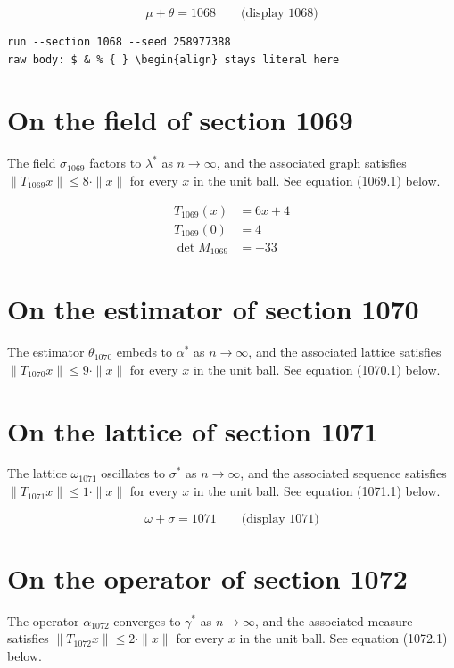 \documentclass{article}
\begin{document}
$$
\mu + \theta = 1068 \qquad \text{(display 1068)}
$$

\begin{verbatim}
run --section 1068 --seed 258977388
raw body: $ & % { } \begin{align} stays literal here
\end{verbatim}

\section{On the field of section 1069}
The field $\sigma_{1069}$ factors to $\lambda^{*}$ as $n \to \infty$,
and the associated graph satisfies $\|T_{1069} x\| \leq 8 \cdot \|x\|$
for every $x$ in the unit ball. See equation (1069.1) below.

\begin{align}
T_{1069}(x) &= 6 x + 4 \\
T_{1069}(0) &= 4 \\
\det M_{1069} &= -33
\end{align}

\section{On the estimator of section 1070}
The estimator $\theta_{1070}$ embeds to $\alpha^{*}$ as $n \to \infty$,
and the associated lattice satisfies $\|T_{1070} x\| \leq 9 \cdot \|x\|$
for every $x$ in the unit ball. See equation (1070.1) below.

\section{On the lattice of section 1071}
The lattice $\omega_{1071}$ oscillates to $\sigma^{*}$ as $n \to \infty$,
and the associated sequence satisfies $\|T_{1071} x\| \leq 1 \cdot \|x\|$
for every $x$ in the unit ball. See equation (1071.1) below.

$$
\omega + \sigma = 1071 \qquad \text{(display 1071)}
$$

\section{On the operator of section 1072}
The operator $\alpha_{1072}$ converges to $\gamma^{*}$ as $n \to \infty$,
and the associated measure satisfies $\|T_{1072} x\| \leq 2 \cdot \|x\|$
for every $x$ in the unit ball. See equation (1072.1) below.
\end{document}
